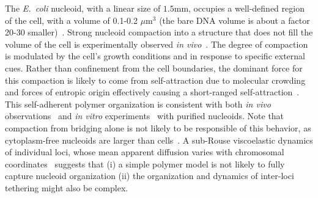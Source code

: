 \documentclass[
preprint,
a4paper,
12pt,
superscriptaddress,
pre]{revtex4}
\begin{document}
The \emph{E.~coli} nucleoid, with a linear size of $1.5$mm, occupies a
well-defined region of the cell, with a volume of 0.1-0.2
$\mu$m$^3$ (the bare DNA volume is about a factor 20-30
smaller)~\cite{Stavans2006}.  Strong nucleoid compaction into a
structure that does not fill the volume of the cell is experimentally
observed \emph{in vivo}~\cite{Zim06b-a,HadizadehYazdi2012}. %
The degree of compaction is modulated by the cell's growth conditions and
in response to specific external cues.  Rather than confinement from
the cell boundaries, the dominant force for this compaction is likely
to come from self-attraction due to molecular crowding and forces of
entropic origin effectively causing a short-ranged
self-attraction~\cite{Odi98,Vries2010}. This self-adherent polymer
organization is consistent with both \emph{in vivo}
observations~\cite{HadizadehYazdi2012,Fisher2013} and \emph{in vitro}
experiments~\cite{Pelletier2012} with purified nucleoids.
%
Note that compaction from bridging alone is not likely to be
responsible of this behavior, as cytoplasm-free nucleoids are larger
than cells~\cite{Pelletier2012,Wegner2012,Thacker2013}.
%
A sub-Rouse viscoelastic dynamics of individual loci, whose mean
apparent diffusion varies with chromosomal
coordinates~\cite{Javer2013,Weber2010} suggests that (i) a simple
polymer model is not likely to fully capture nucleoid organization
(ii) the organization and dynamics of inter-loci tethering might also
be complex.
\end{document}
